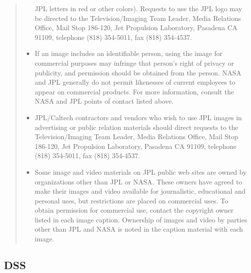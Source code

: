 \begin{quotation}
\begin{itemize}
      JPL letters in red or other colors). Requests to use the JPL logo may
      be directed to the Television/Imaging Team Leader, Media Relations
      Office, Mail Stop 186-120, Jet Propulsion Laboratory, Pasadena CA
      91109, telephone (818) 354-5011, fax (818) 354-4537.
    \item If an image includes an identifiable person, using the image for
      commercial purposes may infringe that person's right of privacy or
      publicity, and permission should be obtained from the person. NASA
      and JPL generally do not permit likenesses of current employees to
      appear on commercial products. For more information, consult the NASA
      and JPL points of contact listed above.
    \item JPL/Caltech contractors and vendors who wish to use JPL images in
      advertising or public relation materials should direct requests to the
      Television/Imaging Team Leader, Media Relations Office, Mail Stop
      186-120, Jet Propulsion Laboratory, Pasadena CA 91109, telephone
      (818) 354-5011, fax (818) 354-4537.
    \item Some image and video materials on JPL public web sites are owned by
      organizations other than JPL or NASA. These owners have agreed to
      make their images and video available for journalistic, educational
      and personal uses, but restrictions are placed on commercial uses.
      To obtain permission for commercial use, contact the copyright owner
      listed in each image caption.  Ownership of images and video by
      parties other than JPL and NASA is noted in the caption material
      with each image.
	\end{itemize}
\end{quotation}

\subsection{DSS}
\label{sec:ack:credits:dss}

